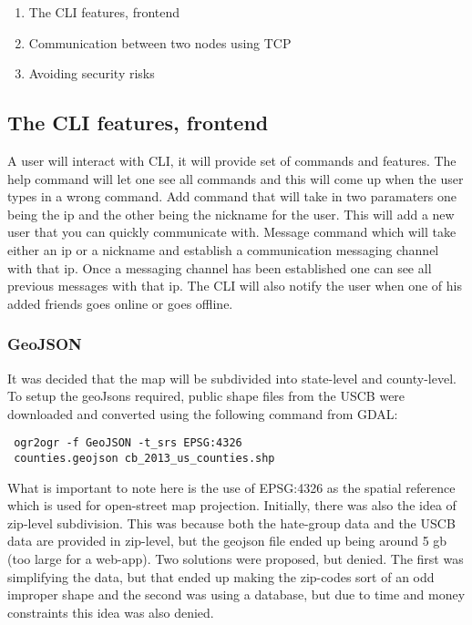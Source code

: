 \documentclass[twoside]{article}
\begin{document}
\begin{multicols}{2}
\begin{enumerate}
  \item The CLI features, frontend
  \item Communication between two nodes using TCP
  \item Avoiding security risks 
\end{enumerate}


\subsection{The CLI features, frontend}
A user will interact with CLI, it will provide set of commands and features. The help command will let one see all commands and this 
will come up when the user types in a wrong command. Add command that will take in two paramaters one being the ip and the other 
being the nickname for the user. This will add a new user that you can quickly communicate with. Message command which will take either an ip or a nickname and establish a communication messaging channel with that ip. Once a messaging channel has been established one can see all previous messages with that ip. The CLI will also notify the user when one of his added friends goes online or goes offline. 

\subsubsection{GeoJSON}
It was decided that the map will be subdivided into state-level and county-level. To setup the geoJsons required, public shape files from the USCB were downloaded and converted using the following command from GDAL:

\begin{verbatim}
 ogr2ogr -f GeoJSON -t_srs EPSG:4326 
 counties.geojson cb_2013_us_counties.shp
\end{verbatim}
What is important to note here is the use of EPSG:4326 as the spatial reference which is used for open-street map projection.
Initially, there was also the idea of zip-level subdivision. This was because both the hate-group data and the USCB data are provided in zip-level, but the geojson file ended up being around 5 gb (too large for a web-app). Two solutions were proposed, but denied. The first was simplifying the data, but that ended up making the zip-codes sort of an odd improper shape and the second was using a database, but due to time and money constraints this idea was also denied. 


\end{multicols}
\end{document}

